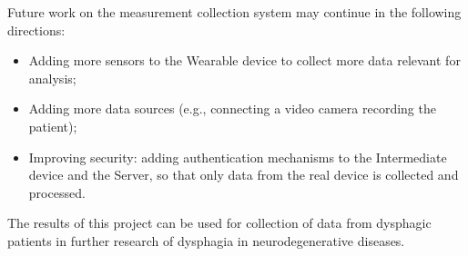 \documentclass[lettersize,journal]{IEEEtran}
\begin{document}
Future work on the measurement collection system may continue in the following directions:
\begin{itemize}
    \item Adding more sensors to the Wearable device to collect more data relevant for analysis;
    \item Adding more data sources (e.g., connecting a video camera recording the patient);
    \item Improving security: adding authentication mechanisms to the Intermediate device and
          the Server, so that only data from the real device is collected and processed.
    \\
\end{itemize}

The results of this project can be used for collection of data from dysphagic patients in
further research of dysphagia in neurodegenerative diseases.



\FloatBarrier

%

\end{document}
